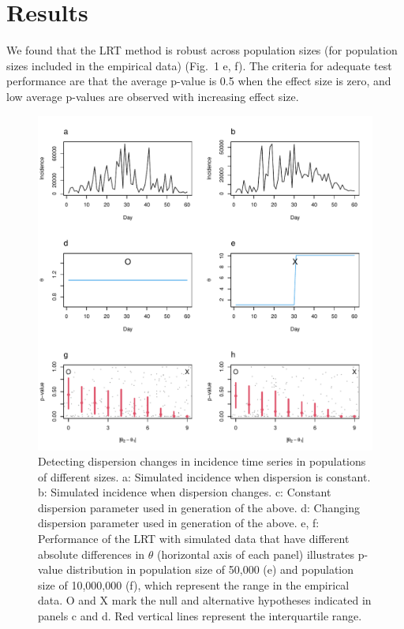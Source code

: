 \documentclass[10pt,letterpaper]{article}
\begin{document}
\section*{Results}
We found that the LRT method is robust across population sizes (for population sizes included in the empirical data) (Fig.\ 1 e, f).
The criteria for adequate test performance are that the average p-value is 0.5 when the effect size is zero, and low average p-values are observed with increasing effect size. 

\begin{figure}[!h]
\includegraphics[width=1\textwidth]{fig1}
\caption{
Detecting dispersion changes in incidence time series in populations of different sizes. a: Simulated incidence when dispersion is constant. b: Simulated incidence when dispersion changes. c: Constant dispersion parameter used in generation of the above. d: Changing dispersion parameter used in generation of the above. e, f: Performance of the LRT with simulated data that have different absolute differences in \begin{math}\theta\end{math} (horizontal axis of each panel) illustrates p-value distribution in population size of 50,000 (e) and population size of 10,000,000 (f), which represent the range in the empirical data. O and X mark the null and alternative hypotheses indicated in panels c and d. Red vertical lines represent the interquartile range. 
 }
\label{fig1}
\end{figure}
\end{document}
